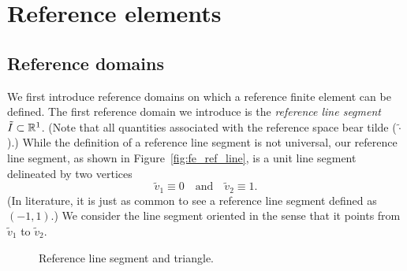 

\section{Reference elements}
\label{sec:fe_ref_elem}
\subsection{Reference domains}
We first introduce reference domains on which a reference finite element can be defined. The first reference domain we introduce is the \emph{reference line segment} $\tilde I \subset \mathbb{R}^1$. (Note that all quantities associated with the reference space bear tilde ($\tilde \cdot$).)  While the definition of a reference line segment is not universal, our reference line segment, as shown in Figure~\ref{fig:fe_ref_line}, is a unit line segment delineated by two vertices
\begin{equation*}
  \tilde v_1 \equiv 0 \quad \text{and} \quad \tilde v_2 \equiv 1.
\end{equation*}
(In literature, it is just as common to see a reference line segment defined as $(-1,1)$.)  We consider the line segment oriented in the sense that it points from $\tilde v_1$ to $\tilde v_2$.

\begin{figure}
  \centering
  \caption{Reference line segment and triangle.\label{fig:fe_ref_elem}}
\end{figure}


